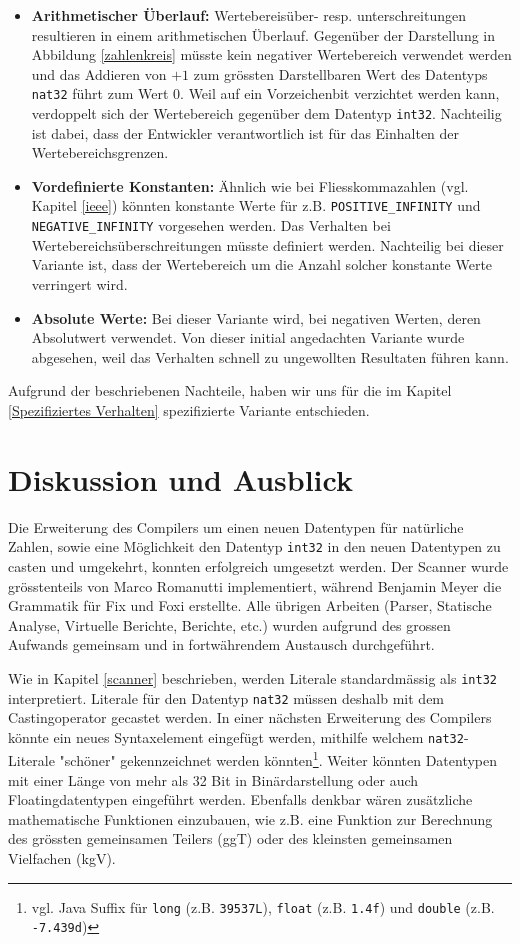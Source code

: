 \documentclass[10pt, a4paper, twocolumn]{article} %
\begin{document}
\begin{itemize}
    \item \textbf{Arithmetischer Überlauf:} Wertebereisüber- resp. unterschreitungen resultieren in einem arithmetischen Überlauf. Gegenüber der Darstellung in Abbildung \ref{zahlenkreis} müsste kein negativer Wertebereich verwendet werden und das Addieren von $+ 1$ zum grössten Darstellbaren Wert des Datentyps \texttt{nat32} führt zum Wert $0$. Weil auf ein Vorzeichenbit verzichtet werden kann, verdoppelt sich der Wertebereich gegenüber dem Datentyp \texttt{int32}. Nachteilig ist dabei, dass der Entwickler verantwortlich ist für das Einhalten der Wertebereichsgrenzen.
    \item \textbf{Vordefinierte Konstanten:} Ähnlich wie bei Fliesskommazahlen (vgl. Kapitel \ref{ieee}) könnten konstante Werte für z.B. \texttt{POSITIVE\_INFINITY} und \texttt{NEGATIVE\_INFINITY} vorgesehen werden. Das Verhalten bei Wertebereichsüberschreitungen müsste definiert werden. Nachteilig bei dieser Variante ist, dass der Wertebereich um die Anzahl solcher konstante Werte verringert wird.
    \item \textbf{Absolute Werte:} Bei dieser Variante wird, bei negativen Werten, deren Absolutwert verwendet. Von dieser initial angedachten Variante wurde abgesehen, weil das Verhalten schnell zu ungewollten Resultaten führen kann.
\end{itemize}

Aufgrund der beschriebenen Nachteile, haben wir uns für die im Kapitel \ref{Spezifiziertes Verhalten} spezifizierte Variante entschieden.

\section{Diskussion und Ausblick}
Die Erweiterung des Compilers um einen neuen Datentypen für natürliche Zahlen, sowie eine Möglichkeit den Datentyp \texttt{int32} in den neuen Datentypen zu casten und umgekehrt, konnten erfolgreich umgesetzt werden.
Der Scanner wurde grösstenteils von Marco Romanutti implementiert, während Benjamin Meyer die Grammatik für Fix und Foxi erstellte.
Alle übrigen Arbeiten (Parser, Statische Analyse, Virtuelle Berichte, Berichte, etc.) wurden aufgrund des grossen Aufwands gemeinsam und in fortwährendem Austausch durchgeführt.

Wie in Kapitel \ref{scanner} beschrieben, werden Literale standardmässig als \texttt{int32} interpretiert.
Literale für den Datentyp \texttt{nat32} müssen deshalb mit dem Castingoperator gecastet werden.
In einer nächsten Erweiterung des Compilers könnte ein neues Syntaxelement eingefügt werden, mithilfe welchem \texttt{nat32}-Literale "schöner" gekennzeichnet werden könnten\footnote{vgl. Java Suffix für \texttt{long} (z.B. \texttt{39537L}), \texttt{float} (z.B. \texttt{1.4f}) und \texttt{double} (z.B. \texttt{-7.439d})}.
Weiter könnten Datentypen mit einer Länge von mehr als 32 Bit in Binärdarstellung oder auch Floatingdatentypen eingeführt werden.
Ebenfalls denkbar wären zusätzliche mathematische Funktionen einzubauen, wie z.B. eine Funktion zur Berechnung des grössten gemeinsamen Teilers (ggT) oder des kleinsten gemeinsamen Vielfachen (kgV).
\end{document}
